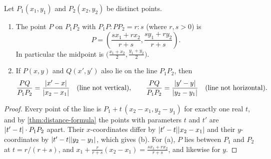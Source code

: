 \begin{theorem}\label{thm:section-formula}
  Let $P_1(x_1, y_1)$ and $P_2(x_2, y_2)$ be distinct points.
  \begin{enumerate}[label=(\alph*)]
    \item The point $P$ on $P_1P_2$ with $P_1P : PP_2 = r : s$ (where
      $r, s > 0$) is
      \[
        P = \left( \frac{s x_1 + r x_2}{r + s}, \frac{s y_1 + r y_2}{r + s} \right).
      \]
      In particular the midpoint is
      $\bigl( \frac{x_1 + x_2}{2}, \frac{y_1 + y_2}{2} \bigr)$.
    \item If $P(x, y)$ and $Q(x', y')$ also lie on the line $P_1P_2$, then
      \[
        \frac{PQ}{P_1P_2} = \frac{\lvert x' - x\rvert}{\lvert x_2 - x_1\rvert}
        \quad\text{(line not vertical)}, \qquad
        \frac{PQ}{P_1P_2} = \frac{\lvert y' - y\rvert}{\lvert y_2 - y_1\rvert}
        \quad\text{(line not horizontal)}.
      \]
  \end{enumerate}
\end{theorem}

\begin{proof}
  Every point of the line is $P_1 + t\,(x_2 - x_1, y_2 - y_1)$ for exactly one
  real $t$, and by \cref{thm:distance-formula} the points with parameters $t$
  and $t'$ are $\lvert t' - t\rvert \cdot P_1P_2$ apart. Their $x$-coordinates differ
  by $\lvert t' - t\rvert \lvert x_2 - x_1\rvert$ and their $y$-coordinates by
  $\lvert t' - t\rvert \lvert y_2 - y_1\rvert$, which gives (b). For (a), $P$ lies between
  $P_1$ and $P_2$ at $t = r / (r + s)$, and
  $x_1 + \frac{r}{r + s}(x_2 - x_1) = \frac{s x_1 + r x_2}{r + s}$, and likewise
  for $y$.
\end{proof}
